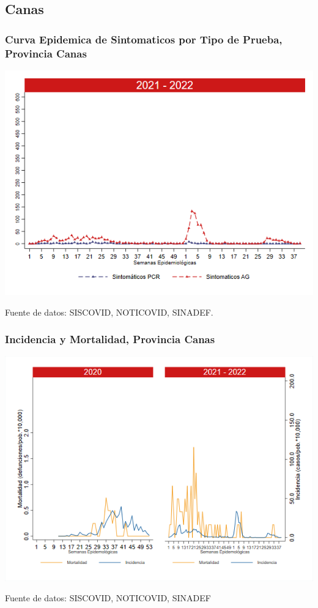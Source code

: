 \documentclass[xcolor=table]{beamer}
\begin{document}
\subsection{Canas}
\begin{frame}[label=Canas]
	\frametitle{Curva Epidemica de Sintomaticos por Tipo de Prueba, Provincia Canas}
	\vspace{-.5cm}
	\begin{center}
		\includegraphics[width=0.8\linewidth, trim={0cm .5cm 0cm 0.2cm},clip]{../figuras/sinto_prueba20_21_4.png}
	\end{center}
	{\tiny Fuente de datos: SISCOVID, NOTICOVID, SINADEF.}
	\hyperlink{TipoPrueba}{}
\end{frame}

\begin{frame}[label=Canas]
	\frametitle{Incidencia y Mortalidad, Provincia Canas}
	\vspace{-.5cm}
	\begin{center}
		\includegraphics[width=0.8\linewidth, trim={0cm .5cm 0cm 0.2cm},clip]{../figuras/incidencia_mortalidad_20_21_4.png}
	\end{center}
	{\tiny Fuente de datos: SISCOVID, NOTICOVID, SINADEF}
\end{frame}
\end{document}
